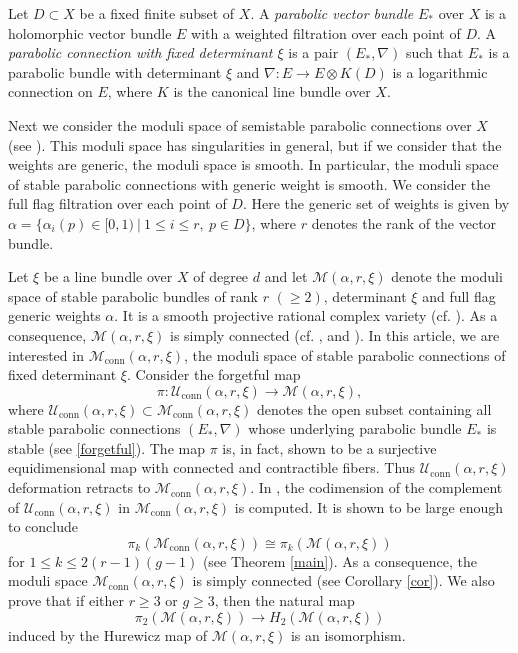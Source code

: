 \documentclass[11pt, reqno]{amsart}
\numberwithin{equation}{section}
\theoremstyle{definition}
\begin{document}
 Let $D \subset X$ be a fixed finite subset of $X$. A \textit{parabolic vector bundle} $E_*$ over $X$ is a holomorphic vector bundle $E$ with a weighted filtration over each point of $D$. A \textit{parabolic connection with fixed determinant $\xi$} is a pair $(E_*,\nabla)$  such that $E_*$ is a parabolic bundle with determinant $\xi$  and $\nabla: E \longrightarrow E \otimes K(D)$ is a logarithmic connection on $E$, where $K$ is the canonical line bundle over $X$. 

Next we consider the moduli space of semistable parabolic connections over $X$ (see \cite{B02, I13, S22}). This moduli space has singularities in general, but if we consider that the weights are generic, the moduli space is smooth. In particular, the moduli space of stable parabolic connections with generic weight is smooth. We consider the full flag filtration over each point of $D$. Here the generic set of weights is given by $\alpha =\{\alpha_i(p) \in [0,1) \  \big\vert \  1\leq i \leq r,\  p \in D\}$, where $r$ denotes the rank of the vector bundle.

 Let $\xi$ be a line bundle over $X$ of degree $d$ and let $\mathcal{M}(\alpha, r, \xi)$ denote the moduli space of stable parabolic bundles of rank $r$ $(\geq 2)$, determinant $\xi$ and full flag generic weights $\alpha$. It is a smooth projective rational complex variety (cf. \cite{BY99}). As a consequence, $\mathcal{M}(\alpha, r, \xi)$ is simply connected (cf. \cite[XI, Corollary 1.2]{SGA1}, and \cite[Corollary 4.18]{D01}). In this article, we are interested in $\mathcal{M}_{\mathrm{conn}}(\alpha, r, \xi)$, the moduli space of stable parabolic connections of fixed determinant $\xi$. Consider the forgetful map
 \[
 \pi : \mathcal{U}_{\mathrm{conn}}(\alpha, r, \xi) \longrightarrow \mathcal{M}(\alpha, r, \xi),
 \]
 where $\mathcal{U}_{\mathrm{conn}}(\alpha, r, \xi) \subset \mathcal{M}_{\mathrm{conn}}(\alpha, r, \xi)$ denotes the open subset containing all stable parabolic connections $(E_*,\nabla)$ whose underlying parabolic bundle $E_*$ is stable (see \ref{forgetful}). The map $\pi$ is, in fact, shown to be a surjective equidimensional map with connected and contractible fibers. Thus $\mathcal{U}_{\mathrm{conn}}(\alpha, r, \xi)$ deformation retracts to $\mathcal{M}_{\mathrm{conn}}(\alpha, r, \xi)$. In , the codimension of the complement of $\mathcal{U}_{\mathrm{conn}}(\alpha, r, \xi)$ in $\mathcal{M}_{\mathrm{conn}}(\alpha, r, \xi)$ is computed. It is shown to be large enough to conclude
 \[
  \pi_k(\mathcal{M}_{\mathrm{conn}}(\alpha, r, \xi)) \cong \pi_k(\mathcal{M}(\alpha, r, \xi))
  \]
 for $1\leq k \leq 2(r-1)(g-1)$ (see Theorem \ref{main}).
 As a consequence, the moduli space $\mathcal{M}_{\mathrm{conn}}(\alpha, r, \xi)$ is simply connected (see Corollary \ref{cor}). We also prove that if either $r\geq 3$ or $g\geq3$,  then the natural map $$\pi_2(\mathcal{M}(\alpha, r, \xi))\longrightarrow H_2(\mathcal{M}(\alpha, r, \xi))$$ induced by the Hurewicz map of $\mathcal{M}(\alpha, r, \xi)$ is an isomorphism. 
 
\end{document}

